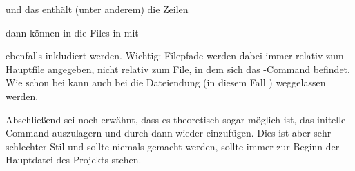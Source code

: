 und das  enthält (unter anderem) die Zeilen
\begin{latexlisting}
	
	
\end{latexlisting}
dann können in  die Files in  mit
\begin{latexlisting}
	
	
\end{latexlisting}
ebenfalls inkludiert werden.
Wichtig: Filepfade werden dabei immer relativ zum Hauptfile  angegeben, nicht relativ zum File, in dem sich das -Command befindet.
Wie schon bei  kann auch bei  die Dateiendung (in diesem Fall ) weggelassen werden.

Abschließend sei noch erwähnt, dass es theoretisch sogar möglich ist, das initelle Command  auszulagern und durch  dann wieder einzufügen.
Dies ist aber sehr schlechter Stil und sollte niemals gemacht werden,  sollte immer zur Beginn der Hauptdatei des Projekts stehen.


